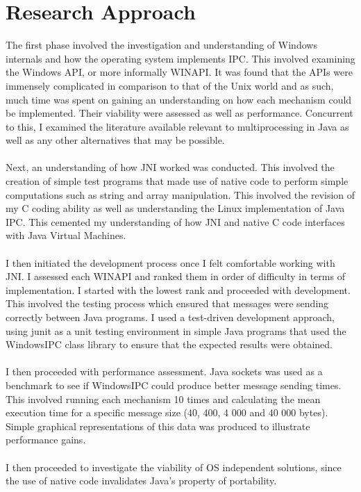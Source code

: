 \documentclass[12pt] {newrucsthesis}    %
\begin{document}
    \section{Research Approach}
      The first phase involved the investigation and understanding of Windows internals
      and how the operating system implements IPC. This involved examining the Windows
      API, or more informally WINAPI. It was found that the APIs were immensely complicated
      in comparison to that of the Unix world and as such, much time was spent on gaining an
      understanding on how each mechanism could be implemented. Their viability were assessed as
      well as performance. Concurrent to this, I examined the literature available relevant to
      multiprocessing in Java as well as any other alternatives that may be possible.
      \\\\
      Next, an understanding of how JNI worked was conducted. This involved the creation of simple
      test programs that made use of native code to perform simple computations such as string and array
      manipulation. This involved the revision of my C coding ability as well as understanding the Linux
      implementation of Java IPC. This cemented my understanding of how JNI and native C code interfaces
      with Java Virtual Machines.
      \\\\
      I then initiated the development process once I felt comfortable working with JNI. I assessed each
      WINAPI and ranked them in order of difficulty in terms of implementation. I started with the lowest rank and
      proceeded with development. This involved the testing process which ensured that messages were sending correctly
      between Java programs. I used a test-driven development approach, using junit as a unit testing environment
      in simple Java programs that used the WindowsIPC class library to ensure that the expected results were obtained.
      \\\\
      I then proceeded with performance assessment. Java sockets was used as a benchmark to see if WindowsIPC could
      produce better message sending times. This involved running each mechanism 10 times and calculating the mean
      execution time for a specific message size (40, 400, 4 000 and 40 000 bytes). Simple graphical representations
      of this data was produced to illustrate performance gains.
      \\\\
      I then proceeded to investigate the viability of OS independent solutions, since the use of native code invalidates Java's
      property of portability.
\end{document}
